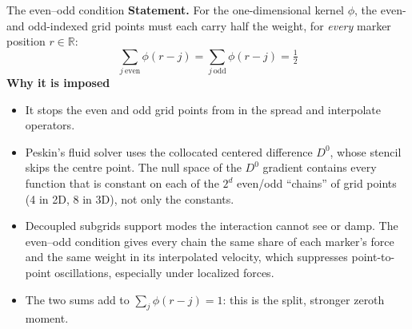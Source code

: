 \documentclass[aspectratio=169,11pt]{beamer}
\begin{document}
\begin{frame}{The even--odd condition}
\small
\textbf{Statement.} For the one-dimensional kernel \(\phi\), the even- and odd-indexed grid points must each carry half the weight, for \emph{every} marker position \(r\in\mathbb R\):
\[
  \boxed{\ \sum_{j\ \mathrm{even}}\phi(r-j)
  =\sum_{j\ \mathrm{odd}}\phi(r-j)=\tfrac12\ }
\]
\vspace{-6pt}
\textbf{Why it is imposed} 
\begin{itemize}\itemsep2pt
  \item It stops the even and odd grid points from  in the spread and interpolate operators.
  \item Peskin's fluid solver uses the collocated centered difference \(D^0\), whose stencil skips the centre point. The null space of the \(D^0\) gradient contains every function that is constant on each of the \(2^d\) even/odd ``chains'' of grid points (4 in 2D, 8 in 3D), not only the constants.
  \item Decoupled subgrids support  modes the interaction cannot see or damp. The even--odd condition gives every chain the same share of each marker's force and the same weight in its interpolated velocity, which suppresses point-to-point oscillations, especially under localized forces.
  \item The two sums add to \(\sum_j\phi(r-j)=1\): this is the split, stronger zeroth moment.
\end{itemize}
\end{frame}
\end{document}
